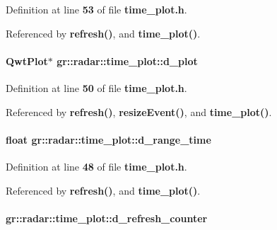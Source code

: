 Definition at line {\bf 53} of file {\bf time\+\_\+plot.\+h}.



Referenced by {\bf refresh()}, and {\bf time\+\_\+plot()}.

\paragraph[{d\+\_\+plot}]{\setlength{\rightskip}{0pt plus 5cm}Qwt\+Plot$\ast$ gr\+::radar\+::time\+\_\+plot\+::d\+\_\+plot\hspace{0.3cm}{\ttfamily [private]}}\label{classgr_1_1radar_1_1time__plot_ae6c111b2b9a93eb6f8e02a7efaf21c08}


Definition at line {\bf 50} of file {\bf time\+\_\+plot.\+h}.



Referenced by {\bf refresh()}, {\bf resize\+Event()}, and {\bf time\+\_\+plot()}.

\paragraph[{d\+\_\+range\+\_\+time}]{\setlength{\rightskip}{0pt plus 5cm}float gr\+::radar\+::time\+\_\+plot\+::d\+\_\+range\+\_\+time\hspace{0.3cm}{\ttfamily [private]}}\label{classgr_1_1radar_1_1time__plot_a820bf8d01536d84f43cc47345a0abfa3}


Definition at line {\bf 48} of file {\bf time\+\_\+plot.\+h}.



Referenced by {\bf refresh()}, and {\bf time\+\_\+plot()}.

\paragraph[{d\+\_\+refresh\+\_\+counter}]{ gr\+::radar\+::time\+\_\+plot\+::d\+\_\+refresh\+\_\+counter\hspace{0.3cm}{\ttfamily [private]}}\label{classgr_1_1radar_1_1time__plot_aa50e9d0e4e6be3335e7db129a15ca104}


